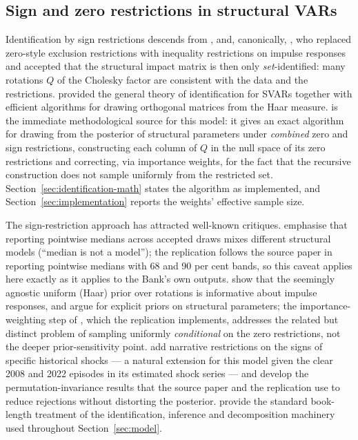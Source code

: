 \subsection{Sign and zero restrictions in structural VARs}

Identification by sign restrictions descends from \citet{faust1998}, \citet{canova2002} and, canonically, \citet{uhlig2005}, who replaced zero-style exclusion restrictions with inequality restrictions on impulse responses and accepted that the structural impact matrix is then only \emph{set}-identified: many rotations $Q$ of the Cholesky factor are consistent with the data and the restrictions. \citet{rubioramirez2010} provided the general theory of identification for SVARs together with efficient algorithms for drawing orthogonal matrices from the Haar measure. \citet{arias2018} is the immediate methodological source for this model: it gives an exact algorithm for drawing from the posterior of structural parameters under \emph{combined} zero and sign restrictions, constructing each column of $Q$ in the null space of its zero restrictions and correcting, via importance weights, for the fact that the recursive construction does not sample uniformly from the restricted set. Section~\ref{sec:identification-math} states the algorithm as implemented, and Section~\ref{sec:implementation} reports the weights' effective sample size.

The sign-restriction approach has attracted well-known critiques. \citet{fry2011} emphasise that reporting pointwise medians across accepted draws mixes different structural models (``median is not a model''); the replication follows the source paper in reporting pointwise medians with 68 and 90 per cent bands, so this caveat applies here exactly as it applies to the Bank's own outputs. \citet{baumeister2015} show that the seemingly agnostic uniform (Haar) prior over rotations is informative about impulse responses, and argue for explicit priors on structural parameters; the importance-weighting step of \citet{arias2018}, which the replication implements, addresses the related but distinct problem of sampling uniformly \emph{conditional} on the zero restrictions, not the deeper prior-sensitivity point. \citet{antolindiaz2018} add narrative restrictions on the signs of specific historical shocks --- a natural extension for this model given the clear 2008 and 2022 episodes in its estimated shock series --- and \citet{chan2025} develop the permutation-invariance results that the source paper and the replication use to reduce rejections without distorting the posterior. \citet{kilian2017} provide the standard book-length treatment of the identification, inference and decomposition machinery used throughout Section~\ref{sec:model}.

